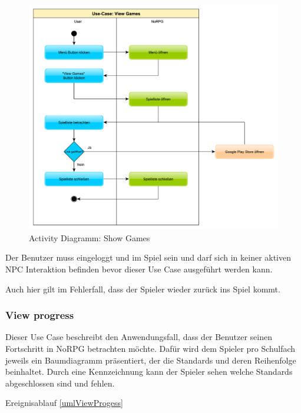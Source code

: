 			\begin{figure}[htbp]
				\centering 
				\label{umlShowGames}
				\includegraphics[width=12cm]{pics/ShowGames.pdf}
				\caption{Activity Diagramm: Show Games}
			\end{figure}

			Der Benutzer muss eingeloggt und im Spiel sein und darf sich in keiner aktiven NPC Interaktion befinden bevor dieser Use Case ausgeführt werden kann.
			
			Auch hier gilt im Fehlerfall, dass der Spieler wieder zurück ins Spiel kommt.
	
		\subsubsection{View progress}
			Dieser Use Case beschreibt den Anwendungsfall, dass der Benutzer seinen Fortschritt in NoRPG betrachten möchte. Dafür wird dem Spieler pro Schulfach jeweils ein Baumdiagramm präsentiert, der die Standards und deren Reihenfolge beinhaltet. Durch eine Kennzeichnung kann der Spieler sehen welche Standards abgeschlossen sind und fehlen.  
			
			Ereignisablauf \ref{umlViewProgess}
			
